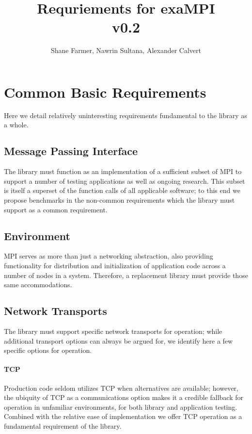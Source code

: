 \documentclass{article}
\title{Requriements for exaMPI\\ v0.2}
\author{Shane Farmer, Nawrin Sultana, Alexander Calvert}
\begin{document}
\maketitle
\tableofcontents


\section{Common Basic Requirements}

Here we detail relatively uninteresting requirements fundamental to the library as a whole.

\subsection{Message Passing Interface}

The library must function as an implementation of a sufficient subset of MPI to support a number of testing applications as well as ongoing research.  This subset is itself a superset of the function calls of all applicable software; to this end we propose benchmarks in the non-common requirements which the library must support as a common requirement.

\subsection{Environment}

MPI serves as more than just a networking abstraction, also providing functionality for distribution and initialization of application code across a number of nodes in a system.  Therefore, a replacement library must provide those same accommodations.

\subsection{Network Transports}

The library must support specific network transports for operation; while additional transport options can always be argued for, we identify here a few specific options for operation.

\paragraph{TCP}  Production code seldom utilizes TCP when alternatives are available; however, the ubiquity of TCP as a communications option makes it a credible fallback for operation in unfamiliar environments, for both library and application testing.  Combined with the relative ease of implementation we offer TCP operation as a fundamental requirement of the library.
\end{document}
